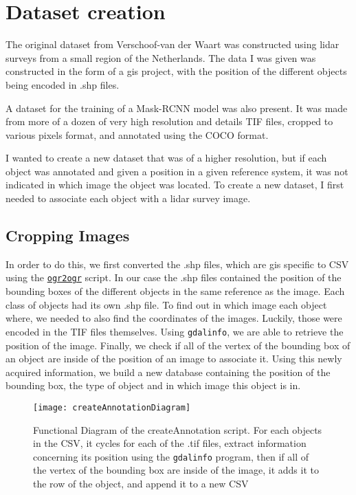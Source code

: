 \section{Dataset creation}%
The original dataset from Verschoof-van der Waart\cite{wouter2019} was constructed using \gls{lidar} surveys from a small region of the Netherlands. The data I was given was constructed in the form of a \gls{gis} project, with the position of the different objects being encoded in .shp files. 

A dataset for the training of a Mask-RCNN\cite{maskrcnn} model was also present. It was made from more of a dozen of very high resolution and details TIF files, cropped to various pixels format, and annotated using the COCO\cite{msCOCO} format.

I wanted to create a new dataset that was of a higher resolution, but if each object was annotated and given a position in a given reference system, it was not indicated in which image the object was located. To create a new dataset, I first needed to associate each object with a \gls{lidar} survey image. 

\subsection{Cropping Images}
In order to do this, we first converted the .shp files, which are \gls{gis} specific to CSV using the \href{https://gdal.org/programs/ogr2ogr.html}{\texttt{ogr2ogr}} script. In our case the .shp files contained the position of the bounding boxes of the different objects in the same reference as the image. Each class of objects had its own .shp file. To find out in which image each object where, we needed to also find the coordinates of the images. Luckily, those were encoded in the TIF files themselves. Using \texttt{gdalinfo}, we are able to retrieve the position of the image. Finally, we check if all of the vertex of the bounding box of an object are inside of the position of an image to associate it. Using this newly acquired information, we build a new database containing the position of the bounding box, the type of object and in which image this object is in.

\begin{figure}[h!]
  \centering
	\texttt{[image: createAnnotationDiagram]}
	\caption[Functionnal Diagram of the createAnnotation script]{Functional Diagram of the createAnnotation script. For each objects in the CSV, it cycles for each of the .tif files, extract information concerning its position using the \texttt{gdalinfo} program, then if all of the vertex of the bounding box are inside of the image, it adds it to the row of the object, and append it to a new CSV}
  \label{fig:annotationScript}
\end{figure}

